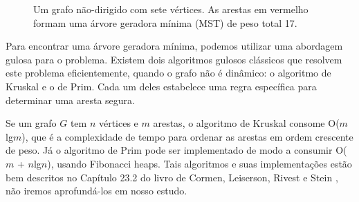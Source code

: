 \begin{figure}
    \centering
    \caption{Um grafo não-dirigido com sete vértices. As arestas em vermelho formam uma árvore geradora mínima (MST) de peso total 17.}
    \label{fig:mst_example}
\end{figure}

Para encontrar uma árvore geradora mínima, podemos utilizar uma abordagem gulosa para o problema. Existem dois algoritmos gulosos clássicos que resolvem este problema eficientemente, quando o grafo não é dinâmico: o algoritmo de Kruskal e o de Prim. Cada um deles estabelece uma regra específica para determinar uma aresta segura.

Se um grafo $G$ tem $n$ vértices e $m$ arestas, o algoritmo de Kruskal consome O($m$lg$m$), que é a complexidade de tempo para ordenar as arestas em ordem crescente de peso. Já o algoritmo de Prim pode ser implementado de modo a consumir O($m$ + $n$lg$n$), usando Fibonacci heaps. Tais algoritmos e suas implementações estão bem descritos no Capítulo 23.2 do livro de Cormen, Leiserson, Rivest e Stein \cite{clrs}, não iremos aprofundá-los em nosso estudo. 

